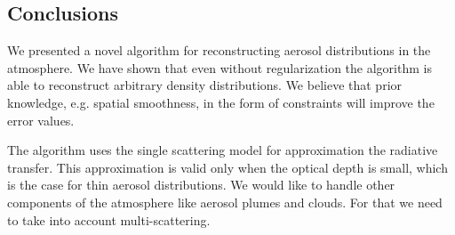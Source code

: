 \documentclass[10pt,twocolumn,letterpaper]{article}
\begin{document}
\subsection{Conclusions}
\label{sec:conclusions}

We presented a novel algorithm for reconstructing aerosol distributions
in the atmosphere. We have shown that even without regularization the
algorithm is able to reconstruct arbitrary density distributions.
We believe that prior knowledge, e.g. spatial smoothness, in the form
of constraints will improve the error values.

The algorithm uses the single scattering model for
approximation the radiative transfer. This approximation is valid only
when the
optical depth is small, which is the case for thin aerosol distributions.
We would like to handle other components of the atmosphere like aerosol
plumes and clouds. For that we need to take into account multi-scattering.


\end{document}
